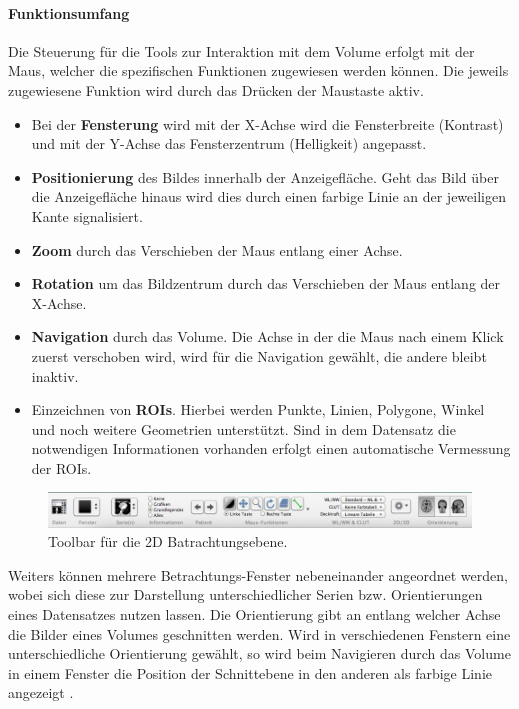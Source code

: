 \paragraph{Funktionsumfang}
Die Steuerung für die Tools zur Interaktion mit dem Volume erfolgt mit der Maus, 
welcher die spezifischen Funktionen zugewiesen werden können. Die jeweils zugewiesene Funktion wird durch das Drücken der Maustaste aktiv.
\begin{itemize}
	\item Bei der \textbf{Fensterung} wird mit der X-Achse wird die Fensterbreite (Kontrast) und mit der Y-Achse das Fensterzentrum (Helligkeit) angepasst.
	\item \textbf{Positionierung} des Bildes innerhalb der Anzeigefläche. Geht das Bild über die Anzeigefläche hinaus wird dies durch einen farbige Linie an der jeweiligen Kante signalisiert.
	\item \textbf{Zoom} durch das Verschieben der Maus entlang einer Achse.
	\item \textbf{Rotation} um das Bildzentrum durch das Verschieben  der Maus entlang der X-Achse.
	\item \textbf{Navigation} durch das Volume. Die Achse in der die Maus nach einem Klick zuerst verschoben wird, wird für die Navigation gewählt, die andere bleibt inaktiv.
	\item Einzeichnen von \textbf{ROIs}. Hierbei werden Punkte, Linien, Polygone, Winkel und noch weitere Geometrien unterstützt. 
		Sind in dem Datensatz die notwendigen Informationen vorhanden erfolgt einen automatische Vermessung der ROIs.
\end{itemize}
\begin{figure}[t]
	\centering
	\includegraphics[width=0.8\linewidth]{img/c2_osirix_2d_view_toolbar.jpg}
	\caption{Toolbar für die 2D Batrachtungsebene.}
	\label{fig:osiri_2dView_toolbar}
\end{figure}
Weiters können mehrere Betrachtungs-Fenster nebeneinander angeordnet werden, wobei sich diese zur Darstellung unterschiedlicher Serien bzw. Orientierungen eines Datensatzes nutzen lassen. 
Die Orientierung gibt an entlang welcher Achse die Bilder eines Volumes geschnitten werden.
Wird in verschiedenen Fenstern eine unterschiedliche Orientierung gewählt,
so wird beim Navigieren durch das Volume in einem Fenster die Position der Schnittebene in den anderen als farbige Linie angezeigt \cite{osirix}.
